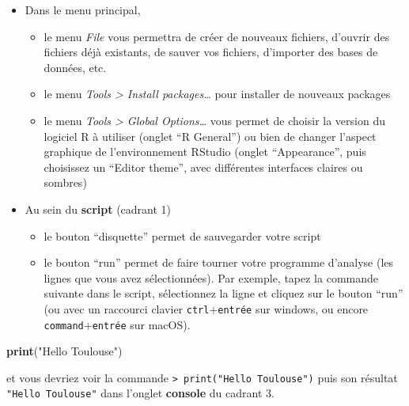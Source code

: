 \documentclass[
]{book}
\newenvironment{Shaded}{\begin{snugshade}}{\end{snugshade}}
\newcommand{\FunctionTok}[1]{\textcolor[rgb]{0.13,0.29,0.53}{\textbf{#1}}}
\newcommand{\NormalTok}[1]{#1}
\newcommand{\StringTok}[1]{\textcolor[rgb]{0.31,0.60,0.02}{#1}}
\providecommand{\tightlist}{%
  \setlength{\itemsep}{0pt}\setlength{\parskip}{0pt}}
\begin{document}
\begin{itemize}
\tightlist
\item
  Dans le menu principal,

  \begin{itemize}
  \tightlist
  \item
    le menu \emph{File} vous permettra de créer de nouveaux fichiers, d'ouvrir des fichiers déjà existants, de sauver vos fichiers, d'importer des bases de données, etc.
  \item
    le menu \emph{Tools \textgreater{} Install packages\ldots{}} pour installer de nouveaux packages
  \item
    le menu \emph{Tools \textgreater{} Global Options\ldots{}} vous permet de choisir la version du logiciel R à utiliser (onglet ``R General'') ou bien de changer l'aspect graphique de l'environnement RStudio (onglet ``Appearance'', puis choisissez un ``Editor theme'', avec différentes interfaces claires ou sombres)
  \end{itemize}
\item
  Au sein du \textbf{script} (cadrant 1)

  \begin{itemize}
  \tightlist
  \item
    le bouton ``disquette'' permet de sauvegarder votre script
  \item
    le bouton ``run'' permet de faire tourner votre programme d'analyse (les lignes que vous avez sélectionnées). Par exemple, tapez la commande suivante dans le script, sélectionnez la ligne et cliquez sur le bouton ``run'' (ou avec un raccourci clavier \texttt{ctrl}+\texttt{entrée} sur windows, ou encore \texttt{command}+\texttt{entrée} sur macOS).
  \end{itemize}
\end{itemize}

\begin{Shaded}
\begin{Highlighting}[]
\FunctionTok{print}\NormalTok{(}\StringTok{"Hello Toulouse"}\NormalTok{)}
\end{Highlighting}
\end{Shaded}

et vous devriez voir la commande \texttt{\textgreater{}\ print("Hello\ Toulouse")} puis son résultat \texttt{"Hello\ Toulouse"} dans l'onglet \textbf{console} du cadrant 3.
\end{document}
